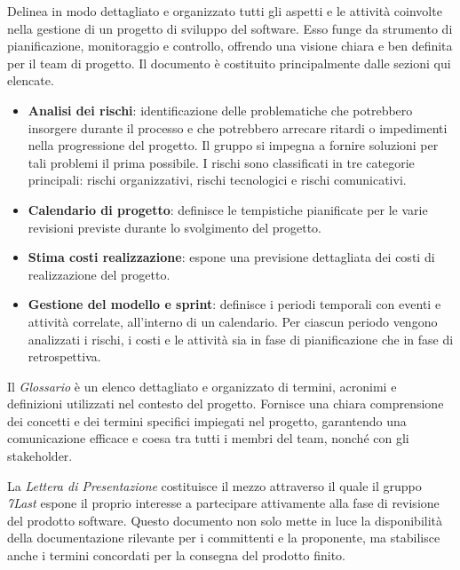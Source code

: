 Delinea in modo dettagliato e organizzato tutti gli aspetti e le attività coinvolte nella gestione di un progetto di sviluppo del software. Esso funge da strumento di pianificazione, monitoraggio e controllo, offrendo una visione chiara e ben definita per il team di progetto. Il documento è costituito principalmente dalle sezioni qui elencate.
\begin{itemize}
	\item \textbf{Analisi dei rischi}: identificazione delle problematiche che potrebbero insorgere durante il processo e che potrebbero arrecare ritardi o impedimenti nella progressione del progetto. Il gruppo si impegna a fornire soluzioni per tali problemi il prima possibile. I rischi sono classificati in tre categorie principali: rischi organizzativi, rischi tecnologici e rischi comunicativi.
	\item \textbf{Calendario di progetto}: definisce le tempistiche pianificate per le varie revisioni previste durante lo svolgimento del progetto.
	\item \textbf{Stima costi realizzazione}: espone una previsione dettagliata dei costi di realizzazione del progetto.
	\item \textbf{Gestione del modello e sprint}: definisce i periodi temporali con eventi e attività correlate, all'interno di un calendario. Per ciascun periodo vengono analizzati i rischi, i costi e le attività sia in fase di pianificazione che in fase di retrospettiva.
\end{itemize}


Il \textit{Glossario} è un elenco dettagliato e organizzato di termini, acronimi e definizioni utilizzati nel contesto del progetto. Fornisce una chiara comprensione dei concetti e dei termini specifici impiegati nel progetto, garantendo una comunicazione efficace e coesa tra tutti i membri del team, nonché con gli stakeholder.

La \textit{Lettera di Presentazione} costituisce il mezzo attraverso il quale il gruppo \textit{7Last} espone il proprio interesse a partecipare attivamente alla fase di revisione del prodotto software. Questo documento non solo mette in luce la disponibilità della documentazione rilevante per i committenti e la proponente, ma stabilisce anche i termini concordati per la consegna del prodotto finito.

